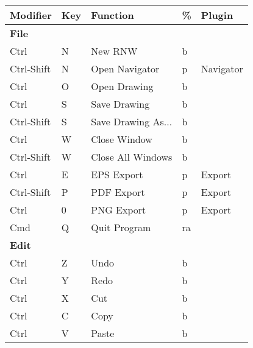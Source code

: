\begin{longtable}{|l|l|l|l|l|}
\hline

Modifier           & Key & Function                  & \%   & Plugin         \\ \hline
\multicolumn{5}{|l|}{\textbf{File}}                                         \\ \hline
Ctrl               & N   & New RNW                   & b    &                \\ \hline
Ctrl-Shift         & N   & Open Navigator            & p    & Navigator      \\ \hline
Ctrl               & O   & Open Drawing              & b    &                \\ \hline
Ctrl               & S   & Save Drawing              & b    &                \\ \hline
Ctrl-Shift         & S   & Save Drawing As...        & b    &                \\ \hline
Ctrl               & W   & Close Window              & b    &                \\ \hline
Ctrl-Shift         & W   & Close All Windows         & b    &                \\ \hline
Ctrl               & E   & EPS Export                & p    & Export         \\ \hline
Ctrl-Shift         & P   & PDF Export                & p    & Export         \\ \hline
Ctrl               & 0   & PNG Export                & p    & Export         \\ \hline
Cmd                & Q   & Quit Program              & ra   &                \\ \hline
\multicolumn{5}{|l|}{\textbf{Edit}}                                         \\ \hline
Ctrl               & Z   & Undo                      & b    &                \\ \hline
Ctrl               & Y   & Redo                      & b    &                \\ \hline
Ctrl               & X   & Cut                       & b    &                \\ \hline
Ctrl               & C   & Copy                      & b    &                \\ \hline
Ctrl               & V   & Paste                     & b    &                \\ \hline

\end{longtable}
